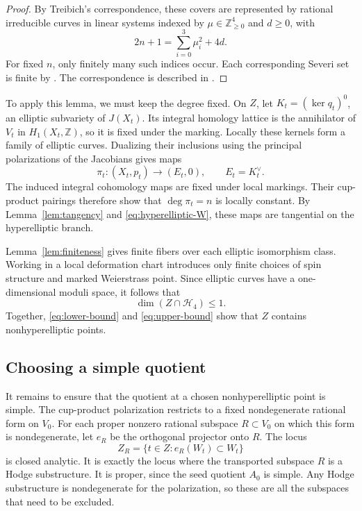 \documentclass[11pt]{amsart}
\theoremstyle{remark}
\numberwithin{equation}{section}
\begin{document}
\begin{proof}
By Treibich's correspondence, these covers are represented by rational
irreducible curves in linear systems indexed by
$\mu\in\mathbb Z_{\geq0}^4$ and $d\geq0$, with
\[
2n+1=\sum_{i=0}^3\mu_i^2+4d.
\]
For fixed $n$, only finitely many such indices occur. Each corresponding
Severi set is finite by \cite[Proposition~2.5, 3.]{treibich2025}.
The correspondence is described in \cite[Section~2, Remark~1, 3.--4.]{treibich2025}.
\end{proof}

To apply this lemma, we must keep the degree fixed. On $Z$, let
$K_t=(\ker q_t)^0$, an elliptic subvariety of $J(X_t)$. Its integral
homology lattice is the annihilator of $V_t$ in $H_1(X_t,\mathbb Z)$,
so it is fixed under the marking. Locally these kernels form a family
of elliptic curves. Dualizing their inclusions using the principal
polarizations of the Jacobians gives maps
\[
\pi_t:(X_t,p_t)\longrightarrow(E_t,0),\qquad E_t=K_t^\vee.
\]
The induced integral cohomology maps are fixed under local markings.
Their cup-product pairings therefore show that $\deg\pi_t=n$ is
locally constant. By Lemma~\ref{lem:tangency} and
\eqref{eq:hyperelliptic-W}, these maps are tangential on the
hyperelliptic branch.

Lemma~\ref{lem:finiteness} gives finite fibers over each elliptic
isomorphism class. Working in a local deformation chart introduces
only finite choices of spin structure and marked Weierstrass point.
Since elliptic curves have a one-dimensional moduli space, it follows
that
\begin{equation}\label{eq:upper-bound}
\dim(Z\cap\mathcal H_4)\leq1.
\end{equation}
Together, \eqref{eq:lower-bound} and \eqref{eq:upper-bound} show that
$Z$ contains nonhyperelliptic points.

\subsection{Choosing a simple quotient}
It remains to ensure that the quotient at a chosen nonhyperelliptic
point is simple. The cup-product polarization restricts to a fixed
nondegenerate rational form on $V_0$. For each proper nonzero rational
subspace $R\subset V_0$ on which this form is nondegenerate, let $e_R$
be the orthogonal projector onto $R$. The locus
\[
Z_R=\{t\in Z:e_R(W_t)\subset W_t\}
\]
is closed analytic. It is exactly the locus where the transported
subspace $R$ is a Hodge substructure. It is proper, since the seed
quotient $A_0$ is simple. Any Hodge substructure is nondegenerate for
the polarization, so these are all the subspaces that need to be
excluded.
\end{document}
